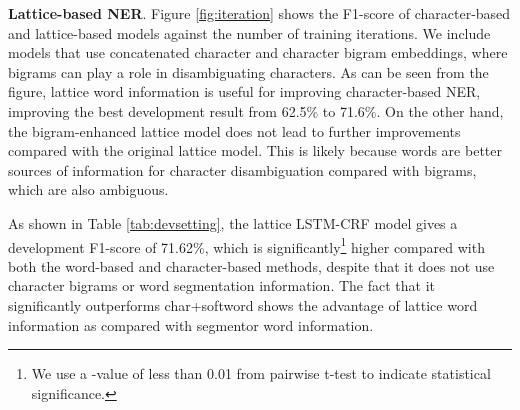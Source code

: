 \documentclass[11pt,a4paper]{article}
\begin{document}
\begin{CJK*}{UTF8}{gbsn}
\begin{table}[!tp]
\begin{center}
\end{center}
\caption{Development results.}
\label{tab:devsetting}
\end{table}
\textbf{Lattice-based NER}. Figure \ref{fig:iteration} shows the F1-score of character-based and lattice-based models against the number of training iterations. We include models that use concatenated character and character bigram embeddings, where bigrams can play a role in disambiguating characters. As can be seen from the figure, lattice word information is useful for improving character-based NER, improving the best development result from 62.5\% to 71.6\%. On the other hand, the bigram-enhanced lattice model does not lead to further improvements compared with the original lattice model. This is likely because words are better sources of information for character disambiguation compared with bigrams, which are also ambiguous. 


As shown in Table \ref{tab:devsetting}, the lattice LSTM-CRF model gives a development F1-score of 71.62\%, which is significantly\footnote{We use a -value of less than 0.01 from pairwise t-test to indicate statistical significance.} higher compared with both the word-based and character-based methods, despite that it does not use character bigrams or word segmentation information. The fact that it significantly outperforms char+softword shows the advantage of lattice word information as compared with segmentor word information.





\end{CJK*}
\end{document}
